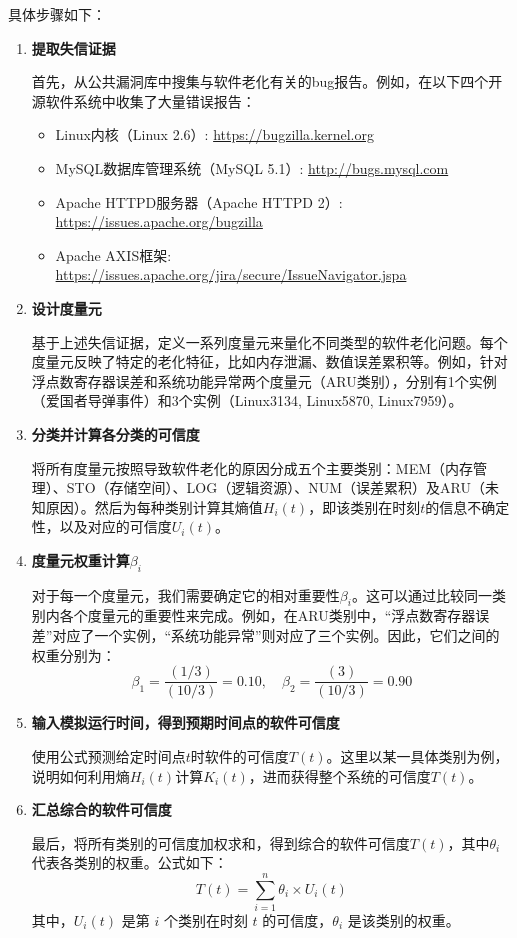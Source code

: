\documentclass{article}
\begin{document}
具体步骤如下：

\begin{enumerate}
	\item \textbf{提取失信证据}
	
	首先，从公共漏洞库中搜集与软件老化有关的bug报告。例如，在以下四个开源软件系统中收集了大量错误报告：
	\begin{itemize}
		\item Linux内核（Linux 2.6）: \url{https://bugzilla.kernel.org}
		\item MySQL数据库管理系统（MySQL 5.1）: \url{http://bugs.mysql.com}
		\item Apache HTTPD服务器（Apache HTTPD 2）: \url{https://issues.apache.org/bugzilla}
		\item Apache AXIS框架: \url{https://issues.apache.org/jira/secure/IssueNavigator.jspa}
	\end{itemize}
	
	\item \textbf{设计度量元}
	
	基于上述失信证据，定义一系列度量元来量化不同类型的软件老化问题。每个度量元反映了特定的老化特征，比如内存泄漏、数值误差累积等。例如，针对浮点数寄存器误差和系统功能异常两个度量元（ARU类别），分别有1个实例（爱国者导弹事件）和3个实例（Linux3134, Linux5870, Linux7959）。
	
	\item \textbf{分类并计算各分类的可信度}
	
	将所有度量元按照导致软件老化的原因分成五个主要类别：MEM（内存管理）、STO（存储空间）、LOG（逻辑资源）、NUM（误差累积）及ARU（未知原因）。然后为每种类别计算其熵值$H_i(t)$，即该类别在时刻$t$的信息不确定性，以及对应的可信度$U_i(t)$。
	
	\item \textbf{度量元权重计算$\beta_i$}
	
	对于每一个度量元，我们需要确定它的相对重要性$\beta_i$。这可以通过比较同一类别内各个度量元的重要性来完成。例如，在ARU类别中，“浮点数寄存器误差”对应了一个实例，“系统功能异常”则对应了三个实例。因此，它们之间的权重分别为：
	$$
	\beta_1 = \frac{(1/3)}{(10/3)} = 0.10,\quad \beta_2 = \frac{(3)}{(10/3)} = 0.90
	$$
	
	\item \textbf{输入模拟运行时间，得到预期时间点的软件可信度}
	
	使用公式预测给定时间点$t$时软件的可信度$T(t)$。这里以某一具体类别为例，说明如何利用熵$H_i(t)$计算$K_i(t)$，进而获得整个系统的可信度$T(t)$。
	
	\item \textbf{汇总综合的软件可信度}
	
	最后，将所有类别的可信度加权求和，得到综合的软件可信度$T(t)$，其中$\theta_i$代表各类别的权重。公式如下：
	$$
	T(t) = \sum_{i=1}^{n} \theta_i \times U_i(t)
	$$
	其中，$U_i(t)$ 是第 $i$ 个类别在时刻 $t$ 的可信度，$\theta_i$ 是该类别的权重。
\end{enumerate}
\end{document}
